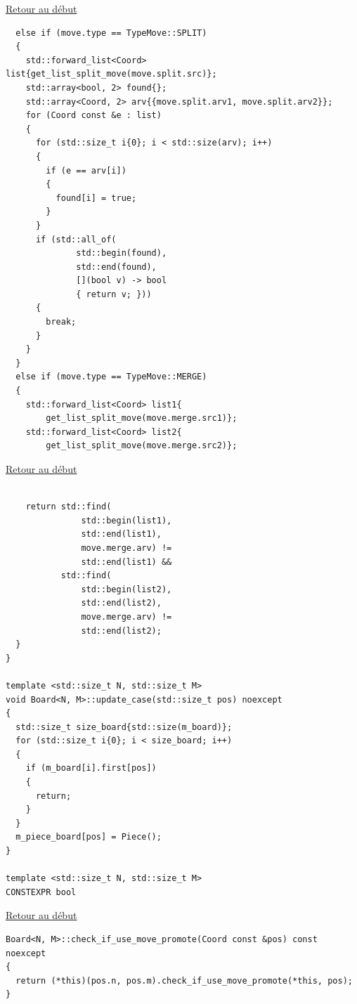 {\begin{frame}[fragile]
\hyperlink{conclusion}{Retour au début}\newline
\begin{verbatim}
  else if (move.type == TypeMove::SPLIT)
  {
    std::forward_list<Coord> list{get_list_split_move(move.split.src)};
    std::array<bool, 2> found{};
    std::array<Coord, 2> arv{{move.split.arv1, move.split.arv2}};
    for (Coord const &e : list)
    {
      for (std::size_t i{0}; i < std::size(arv); i++)
      {
        if (e == arv[i])
        {
          found[i] = true;
        }
      }
      if (std::all_of(
              std::begin(found),
              std::end(found),
              [](bool v) -> bool
              { return v; }))
      {
        break;
      }
    }
  }
  else if (move.type == TypeMove::MERGE)
  {
    std::forward_list<Coord> list1{
        get_list_split_move(move.merge.src1)};
    std::forward_list<Coord> list2{
        get_list_split_move(move.merge.src2)};
\end{verbatim}
\end{frame}

\begin{frame}[fragile]
\hyperlink{conclusion}{Retour au début}\newline
\begin{verbatim}

    return std::find(
               std::begin(list1),
               std::end(list1),
               move.merge.arv) !=
               std::end(list1) &&
           std::find(
               std::begin(list2),
               std::end(list2),
               move.merge.arv) !=
               std::end(list2);
  }
}

template <std::size_t N, std::size_t M>
void Board<N, M>::update_case(std::size_t pos) noexcept
{
  std::size_t size_board{std::size(m_board)};
  for (std::size_t i{0}; i < size_board; i++)
  {
    if (m_board[i].first[pos])
    {
      return;
    }
  }
  m_piece_board[pos] = Piece();
}

template <std::size_t N, std::size_t M>
CONSTEXPR bool
\end{verbatim}
\end{frame}

\begin{frame}[fragile]
\hyperlink{conclusion}{Retour au début}\newline
\begin{verbatim}
Board<N, M>::check_if_use_move_promote(Coord const &pos) const noexcept
{
  return (*this)(pos.n, pos.m).check_if_use_move_promote(*this, pos);
}


\end{verbatim}
\end{frame}}
